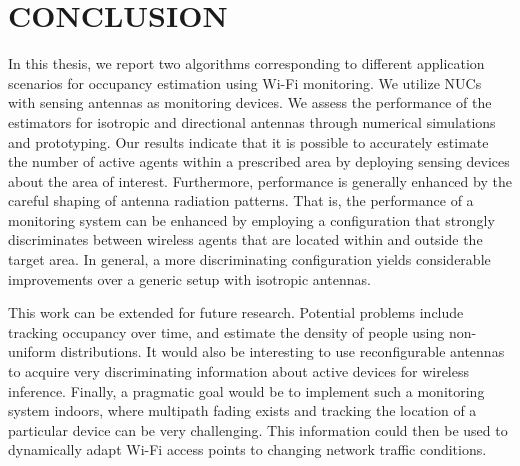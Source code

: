\chapter{CONCLUSION}

In this thesis, we report two algorithms corresponding to different application scenarios for occupancy estimation using Wi-Fi monitoring.
We utilize NUCs with sensing antennas as monitoring devices.
We assess the performance of the estimators for isotropic and directional antennas through numerical simulations and prototyping.
Our results indicate that it is possible to accurately estimate the number of active agents within a prescribed area by deploying sensing devices about the area of interest.
Furthermore, performance is generally enhanced by the careful shaping of antenna radiation patterns.
That is, the performance of a monitoring system can be enhanced by employing a configuration that strongly discriminates between wireless agents that are located within and outside the target area.
In general, a more discriminating configuration yields considerable improvements over a generic setup with isotropic antennas.

This work can be extended for future research.
Potential problems include tracking occupancy over time, and estimate the density of people using non-uniform distributions.
It would also be interesting to use reconfigurable antennas to acquire very discriminating information about active devices for wireless inference.
Finally, a pragmatic goal would be to implement such a monitoring system indoors, where multipath fading exists and tracking the location of a particular device can be very challenging.
This information could then be used to dynamically adapt Wi-Fi access points to changing network traffic conditions.

